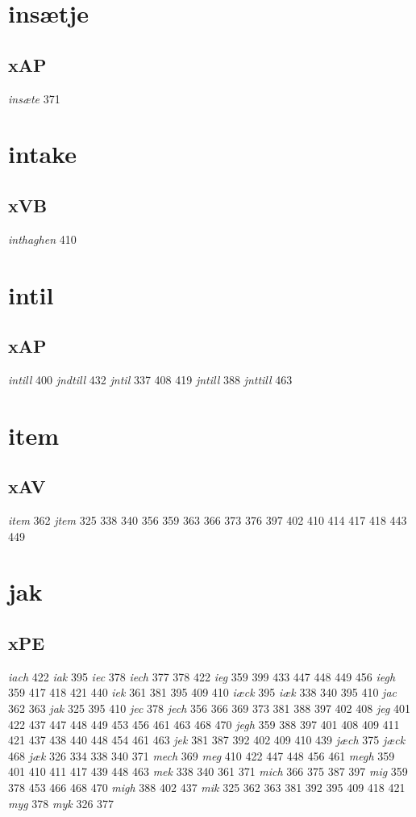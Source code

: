 \documentclass[a4paper,twocolumn]{article}
\begin{document}
\section{insætje}
\label{sec:orgc0022ec}
\subsection{xAP}
\label{sec:org0bd10ae}
\emph{insæte} 371 
\section{intake}
\label{sec:org807e3e6}
\subsection{xVB}
\label{sec:org7652433}
\emph{inthaghen} 410 
\section{intil}
\label{sec:org528bff3}
\subsection{xAP}
\label{sec:org001080b}
\emph{intill} 400 \emph{jndtill} 432 \emph{jntil} 337 408 419 \emph{jntill} 388 \emph{jnttill} 463 
\section{item}
\label{sec:org16a381d}
\subsection{xAV}
\label{sec:org18b2c71}
\emph{item} 362 \emph{jtem} 325 338 340 356 359 363 366 373 376 397 402 410 414 417 418 443 449 
\section{jak}
\label{sec:orgb5a115d}
\subsection{xPE}
\label{sec:orge352416}
\emph{iach} 422 \emph{iak} 395 \emph{iec} 378 \emph{iech} 377 378 422 \emph{ieg} 359 399 433 447 448 449 456 \emph{iegh} 359 417 418 421 440 \emph{iek} 361 381 395 409 410 \emph{iæck} 395 \emph{iæk} 338 340 395 410 \emph{jac} 362 363 \emph{jak} 325 395 410 \emph{jec} 378 \emph{jech} 356 366 369 373 381 388 397 402 408 \emph{jeg} 401 422 437 447 448 449 453 456 461 463 468 470 \emph{jegh} 359 388 397 401 408 409 411 421 437 438 440 448 454 461 463 \emph{jek} 381 387 392 402 409 410 439 \emph{jæch} 375 \emph{jæck} 468 \emph{jæk} 326 334 338 340 371 \emph{mech} 369 \emph{meg} 410 422 447 448 456 461 \emph{megh} 359 401 410 411 417 439 448 463 \emph{mek} 338 340 361 371 \emph{mich} 366 375 387 397 \emph{mig} 359 378 453 466 468 470 \emph{migh} 388 402 437 \emph{mik} 325 362 363 381 392 395 409 418 421 \emph{myg} 378 \emph{myk} 326 377 
\end{document}

